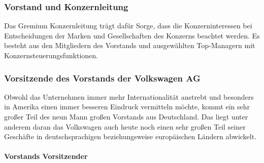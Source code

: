 \documentclass[12pt]{article}
\begin{document}
\subsubsection{Vorstand und Konzernleitung}
Das Gremium Konzernleitung trägt dafür Sorge, dass die Konzerninteressen bei Entscheidungen der Marken und Gesellschaften des Konzerns beachtet werden. Es besteht aus den Mitgliedern des Vorstands und ausgewählten Top-Managern mit Konzernsteuerungsfunktionen.\cite{struktur}

\subsubsection{Vorsitzende des Vorstands der Volkswagen AG}
Obwohl das Unternehmen immer mehr Internationalität anstrebt und besonders in Amerika einen immer besseren Eindruck vermitteln möchte, kommt ein sehr großer Teil des neun Mann großen Vorstands aus Deutschland. Das liegt unter anderem daran das Volkswagen auch heute noch einen sehr großen Teil seiner Geschäfte in deutschsprachigen beziehungsweise europäischen Ländern abwickelt.\cite{vorstand} \\ \\
\textbf{Vorstands Vorsitzender}
\end{document}
